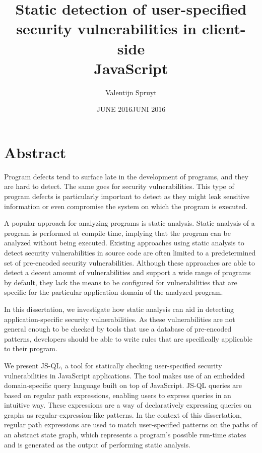 \documentclass[a4paper, 12pt]{report}
\author{Valentijn Spruyt}
\title{Static detection of user-specified \\ security vulnerabilities in client-side\\ JavaScript}
\date{JUNE 2016}
\theoremstyle{definition}
\begin{document}
\maketitlepage
 
 
\date{JUNI 2016}
 
\maketitlepage


\chapter*{Abstract}

Program defects tend to surface late in the development of programs, and they are hard to detect.
The same goes for security vulnerabilities. This type of program defects is particularly important to detect as they might leak sensitive information or even compromise the system on which the program is executed.

A popular approach for analyzing programs is static analysis. Static analysis of a program is performed at compile time, implying that the program can be analyzed without being executed.
 Existing approaches using static analysis to detect security vulnerabilities in source code are often limited to a predetermined set of pre-encoded security vulnerabilities. Although these approaches are able to detect a decent amount of vulnerabilities and support a wide range of programs by default, they lack the means to be configured for vulnerabilities that are specific for the particular application domain of the analyzed program.

In this dissertation, we investigate how static analysis can aid in detecting application-specific security vulnerabilities. As these vulnerabilities are not general enough to be checked by tools that use a database of pre-encoded patterns, developers should be able to write rules that are specifically applicable to their program. 

We present JS-QL, a tool for statically checking user-specified security vulnerabilities in JavaScript applications. The tool makes use of an embedded domain-specific query language built on top of JavaScript. JS-QL queries are based on regular path expressions, enabling users to express queries in an intuitive way. These expressions are a way of declaratively expressing queries on graphs as regular-expression-like patterns. In the context of this dissertation, regular path expressions are used to match user-specified patterns on the paths of an abstract state graph, which represents a program's possible run-time states and is generated as the output of performing static analysis.
\end{document}

